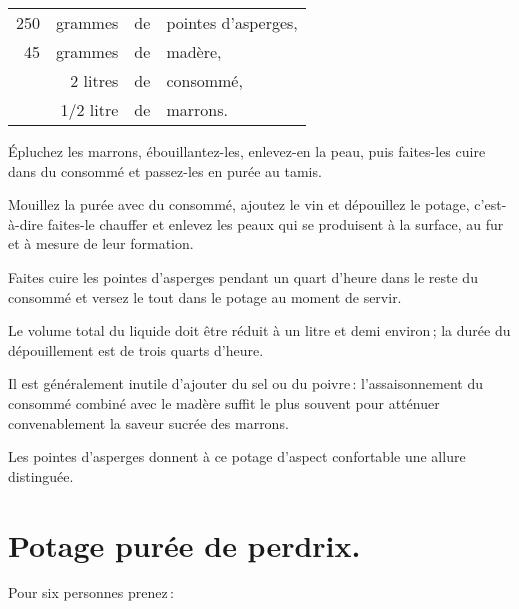 \medskip

\footnotesize
\begin{longtable}{rrrp{16em}}                                                    
    250 & grammes     & de  & pointes d'asperges,                                                         \\
     45 & grammes     & de  & madère,                                                                     \\
        & 2 litres    & de  & consommé,                                                                   \\
        & 1/2 litre   & de  & marrons.                                                                    \\
\end{longtable}
\normalsize

Épluchez les marrons, ébouillantez-les, enlevez-en la peau, puis faites-les
cuire dans du consommé et passez-les en purée au tamis.

Mouillez la purée avec du consommé, ajoutez le vin et dépouillez le potage,
c'est-à-dire faites-le chauffer et enlevez les peaux qui se produisent à la
surface, au fur et à mesure de leur formation.

Faites cuire les pointes d'asperges pendant un quart d'heure dans le reste du
consommé et versez le tout dans le potage au moment de servir.

Le volume total du liquide doit être réduit à un litre et demi environ ; la
durée du dépouillement est de trois quarts d'heure.

Il est généralement inutile d'ajouter du sel ou du poivre : l'assaisonnement du
consommé combiné avec le madère suffit le plus souvent pour atténuer
convenablement la saveur sucrée des marrons.

\smallskip

Les pointes d'asperges donnent à ce potage d'aspect confortable une allure
distinguée.

\section*{\centering Potage purée de perdrix.}

Pour six personnes prenez :

\medskip

